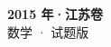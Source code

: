 \documentclass[zihao=-4, a4paper]{ctexart}
\begin{document}
\begin{center}
  {\Large\bfseries 2015 年·江苏卷}\\[4pt]
  {\large 数学 · 试题版}
\end{center}
\medskip
{}

\end{document}
